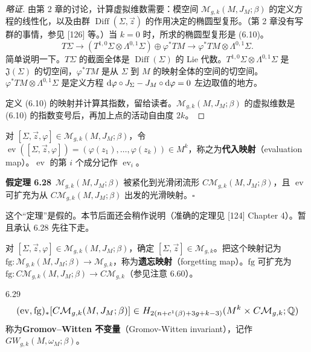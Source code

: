 \begin{proof}[略证]
  由第 2 章的讨论，计算虚拟维数需要：模空间 $\mathcal{M}_{g,k}(M,J_M;\beta)$ 的定义方程的线性化，以及由群 $\operatorname{Diff}(\Sigma,\vec z)$ 的作用决定的椭圆型复形。（第 2 章没有写群的事情，参见 [126] 等。）当 $k=0$ 时，所求的椭圆型复形是 (6.10)。
  \begin{equation}
    T\Sigma\longrightarrow(T^{1,0}\Sigma\otimes\Lambda^{0,1}\Sigma)\oplus\varphi^*TM\longrightarrow\varphi^*TM\otimes\Lambda^{0,1}\Sigma. \tag{6.10}
  \end{equation}
  简单说明一下。$T\Sigma$ 的截面全体是 $\operatorname{Diff}(\Sigma)$ 的 Lie 代数。$T^{1,0}\Sigma\otimes\Lambda^{0,1}\Sigma$ 是 $\mathfrak{J}(\Sigma)$ 的切空间，$\varphi^*TM$ 是从 $\Sigma$ 到 $M$ 的映射全体的空间的切空间。$\varphi^*TM\otimes\Lambda^{0,1}\Sigma$ 是定义方程 $\mathrm{d}\varphi\circ J_\Sigma-J_M\circ\mathrm{d}\varphi=0$ 左边取值的地方。

  定义 (6.10) 的映射并计算其指数，留给读者。$\mathcal{M}_{g,k}(M,J_M;\beta)$ 的虚拟维数是 (6.10) 的指数变号后，再加上点的活动自由度 $2k$。
\end{proof}

对 $[\Sigma,\vec z,\varphi]\in\mathcal{M}_{g,k}(M,J_M;\beta)$，令 $\operatorname{ev}([\Sigma,\vec z,\varphi])=(\varphi(z_1),\dots,\varphi(z_k))\in M^k$，称之为\textbf{代入映射}（evaluation map）。$\operatorname{ev}$ 的第 $i$ 个成分记作 $\operatorname{ev}_i$。

\par\medskip\noindent\textbf{假定理 6.28}\ $\mathcal{M}_{g,k}(M,J_M;\beta)$ 被紧化到光滑闭流形 $C\mathcal{M}_{g,k}(M,J_M;\beta)$，且 $\operatorname{ev}$ 可扩充为从 $C\mathcal{M}_{g,k}(M,J_M;\beta)$ 出发的光滑映射。\hfill$\square$\par\medskip

这个“定理”是假的。本节后面还会稍作说明（准确的定理见 [124] Chapter 4）。暂且承认 6.28 先往下走。

对 $[\Sigma,\vec z,\varphi]\in\mathcal{M}_{g,k}(M,J_M;\beta)$，确定 $[\Sigma,\vec z]\in\mathcal{M}_{g,k}$。把这个映射记为 $\mathrm{fg}\colon\mathcal{M}_{g,k}(M,J_M;\beta)\to\mathcal{M}_{g,k}$，称为\textbf{遗忘映射}（forgetting map）。$\mathrm{fg}$ 可扩充为 $\mathrm{fg}\colon C\mathcal{M}_{g,k}(M,J_M;\beta)\to C\mathcal{M}_{g,k}$（参见注意 6.60）。

\begin{definition}{6.29}
\[
  \resizebox{0.97\linewidth}{!}{$\displaystyle (\operatorname{ev},\mathrm{fg})_*[C\mathcal{M}_{g,k}(M,J_M;\beta)]\in H_{2(n+c^1(\beta)+3g+k-3)}(M^k\times C\mathcal{M}_{g,k};\Q) $}
\]
  称为\textbf{Gromov–Witten 不变量}（Gromov-Witten invariant），记作 $GW_{g,k}(M,\omega_M;\beta)$。
\end{definition}

